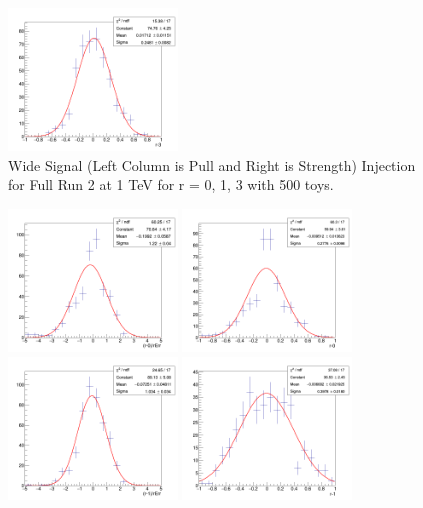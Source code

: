\begin{figure}[!htb]
	\includegraphics[width=0.4\textwidth]{Figures/signalInjection3_500_sigstrength_1000wide.png}
	\caption{Wide Signal (Left Column is Pull and Right is Strength) Injection for Full Run 2 at 1 TeV for r = 0, 1, 3 with 500 toys.}
	\label{fig:signalInjection1000plotwide}
\end{figure}

\begin{figure}[!htb]
	\centering
	\includegraphics[width=0.4\textwidth]{Figures/signalInjection0_500_sigpull_2000wide.png}
	\includegraphics[width=0.4\textwidth]{Figures/signalInjection0_500_sigstrength_2000wide.png}
	\includegraphics[width=0.4\textwidth]{Figures/signalInjection1_500_sigpull_2000wide.png}
	\includegraphics[width=0.4\textwidth]{Figures/signalInjection1_500_sigstrength_2000wide.png}

\end{figure}
